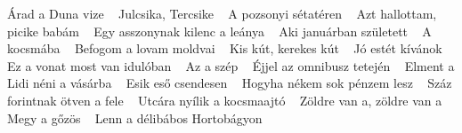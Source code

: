 \footnotesize Árad a Duna vize \ \textbf{\pageref{adaDunavize}} \newline
\footnotesize Julcsika, Tercsike \ \textbf{\pageref{a2CTercsike}} \newline
\footnotesize A pozsonyi sétatéren \ \textbf{\pageref{nyisC3A9tatC3A9ren}} \newline
\footnotesize Azt hallottam, picike babám \ \textbf{\pageref{lottam2CpicikebabC3A1m}} \newline
\footnotesize Egy asszonynak kilenc a leánya \ \textbf{\pageref{zonynakkilencaleC3A1nya}} \newline
\footnotesize Aki januárban született \ \textbf{\pageref{uC3A1rbanszC3BCletett}} \newline
\footnotesize A kocsmába \ \textbf{\pageref{C3A1ba}} \newline
\footnotesize Befogom a lovam moldvai \ \textbf{\pageref{alovammoldvai}} \newline
\footnotesize Kis kút, kerekes kút \ \textbf{\pageref{3BAt2CkerekeskC3BAt}} \newline
\footnotesize Jó estét kívánok \ \textbf{\pageref{estC3A9tkC3ADvC3A1nok}} \newline
\footnotesize Ez a vonat most van idulóban \ \textbf{\pageref{natmostvanidulC3B3ban}} \newline
\footnotesize Az a szép \ \textbf{\pageref{C3A9p}} \newline
\footnotesize Éjjel az omnibusz tetején \ \textbf{\pageref{jelazomnibusztetejC3A9n}} \newline
\footnotesize Elment a Lidi néni a vásárba \ \textbf{\pageref{aLidinC3A9niavC3A1sC3A1rba}} \newline
\footnotesize Esik eső csendesen \ \textbf{\pageref{C591csendesen}} \newline
\footnotesize Hogyha nékem sok pénzem lesz \ \textbf{\pageref{nC3A9kemsokpC3A9nzemlesz}} \newline
\footnotesize Száz forintnak ötven a fele \ \textbf{\pageref{1zforintnakC3B6tvenafele}} \newline
\footnotesize Utcára nyílik a kocsmaajtó \ \textbf{\pageref{A1ranyC3ADlikakocsmaajtC3B3}} \newline
\footnotesize Zöldre van a, zöldre van a \ \textbf{\pageref{ldrevana2CzC3B6ldrevana}} \newline
\footnotesize Megy a gőzös \ \textbf{\pageref{gC591zC3B6s}} \newline
\footnotesize Lenn a délibábos Hortobágyon \ \textbf{\pageref{dC3A9libC3A1bosHortobC3A1gyon}} \newline
